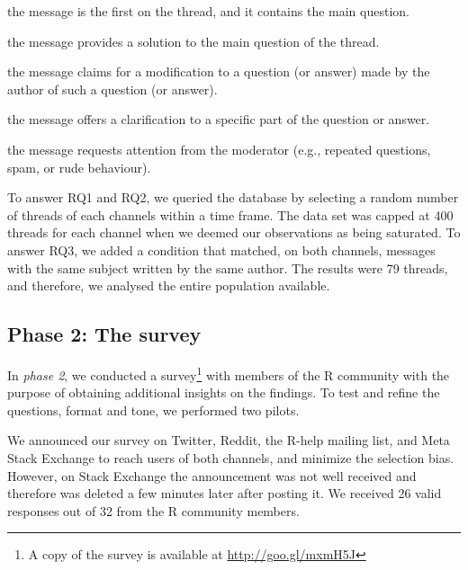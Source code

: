 	\begin{description}[itemsep=3pt, topsep=2pt, leftmargin=3em, parsep=0pt]
		\item[Question:] the message is the first on the thread, and it contains the main question.
		\item[Answer:] the message provides a solution to the main question of the thread.
	 	\item[Update:] the message claims for a modification to a question (or answer) made by the author of such a question (or answer).
		\item[Comment:] the message offers a clarification to a specific part of the question or answer.
		\item[Flag:] the message requests attention from the moderator (e.g., repeated questions, spam, or rude behaviour).
	\end{description}

	To answer RQ1 and RQ2, we queried the database by selecting a random number of threads of each channels within a time frame.
	The data set was capped at 400 threads for each channel when we deemed our observations as being saturated.
	To answer RQ3, we added a condition that matched, on both channels, messages with the same subject written by the same author.
	The results were 79 threads, and therefore, we analysed the entire population available. 

\subsection{Phase 2: The survey} 

    In \textit{phase 2}, we conducted a survey\footnote{A copy of the survey is available at \url{http://goo.gl/mxmH5J}} with members of the R community with the purpose of obtaining additional insights on the findings.
    To test and refine the questions, format and tone, we performed two pilots.
    
    We announced our survey on Twitter, Reddit, the R-help mailing list, and Meta Stack Exchange to reach users of both channels, and minimize the selection bias.
    However, on Stack Exchange the announcement was not well received and therefore was deleted a few minutes later after posting it.
    We received 26 valid responses out of 32 from the R community members.

